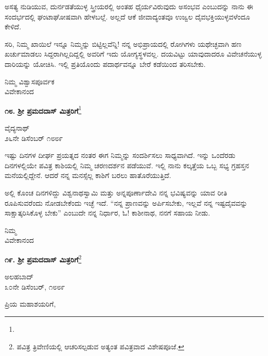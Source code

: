 ಅಸತ್ಯ ನುಡಿಯುವ, ದುರ್ನಡತೆಯುಳ್ಳ ಸ್ತ್ರೀಯರಲ್ಲಿ ಅಂತಹ ಧೈರ್ಯವಿರುವುದು ಅಸಂಭವ ಎಂಬುದನ್ನು ನಾನು ಈ ಸಂದರ್ಭದಲ್ಲಿ ಘಂಟಾಘೋಷವಾಗಿ ಹೇಳಬಲ್ಲೆ. ಅಲ್ಲದೆ ಆಕೆ ಜೀವಾದ್ಯಂತವೂ ಉಜ್ವಲ ದೈವಭಕ್ತಿಯುಳ್ಳವಳೆಂದೂ ಕೇಳಿದೆ.

ಸರಿ, ನಿಮ್ಮ ಖಾಯಿಲೆ ಇನ್ನೂ ನಿಮ್ಮನ್ನು ಬಿಟ್ಟಿಲ್ಲವೆನ್ನಿ! ನನ್ನ ಅಭಿಪ್ರಾಯದಲ್ಲಿ ರೋಗಿಗಳು ಯಥೇಚ್ಛವಾಗಿ ಹಣ ಖರ್ಚುಮಾಡಲು ಸಿದ್ದರಾಗಿಲ್ಲದಿದ್ದಲ್ಲಿ ಅವರಿಗೆ ಇದು ಯೋಗ್ಯಸ್ಥಳವಲ್ಲ. ದಯವಿಟ್ಟು ಯಾವುದಾದರೂ ವಿವೇಚನೆಯುಳ್ಳ ದಾರಿಯನ್ನು ಯೋಚಿಸಿ. ಇಲ್ಲಿ ಪ್ರತಿಯೊಂದು ಪದಾರ್ಥವನ್ನೂ ಬೇರೆ ಕಡೆಯಿಂದ ತರಿಸಬೇಕು.

\vspace{-0.3cm}

{\flushright
ನಿಮ್ಮ ವಿಶ್ವಾಸಪೂರ್ವಕ\\ವಿವೇಕಾನಂದ\par}

\begin{center}
\textbf{೧೮. ಶ‍್ರೀ ಪ್ರಮದದಾಸ್ ಮಿತ್ರರಿಗೆ}\footnote{}
\end{center}

\begin{flushright}
ವೈದ್ಯನಾಥ್\\೨೬ನೇ ಡಿಸೆಂಬರ್ ೧೮೮೯
\end{flushright}

ಇಷ್ಟು ದಿನಗಳ ದೀರ್ಘ ಪ್ರಯತ್ನದ ನಂತರ ಈಗ ನಿಮ್ಮನ್ನು ಸಂದರ್ಶಿಸಲು ಸಾಧ್ಯವಾಗಿದೆ. ಇನ್ನು ಒಂದೆರಡು ದಿನಗಳಲ್ಲಿಯೇ ಪವಿತ್ರ ಕಾಶಿಯಲ್ಲಿ ನಿಮ್ಮ ಚರಣದರ್ಶನ ಪಡೆಯುವೆ. ಇಲ್ಲಿ ನಾನು ಕಲ್ಕತ್ತೆಯ ಒಬ್ಬ ಸಭ್ಯ ಗ್ರಹಸ್ತನ ಮನೆಯಲ್ಲಿದ್ದೇನೆ. ಆದರೆ ನನ್ನ ಮನಸ್ಸೆಲ್ಲ ಕಾಶಿಗೆ ಬರಲು ಹಾತೊರೆಯುತ್ತಿದೆ.

ಅಲ್ಲಿ ಕೊಂಚ ದಿನಗಳಿದ್ದು ವಿಶ್ವನಾಥಸ್ವಾಮಿ ಮತ್ತು ಅನ್ನಪೂರ್ಣಾದೇವಿ ನನ್ನ ಭವಿಷ್ಯವನ್ನು ಯಾವ ರೀತಿ ರೂಪಿಸುವರೆಂದು ನೋಡಬೇಕೆಂದು ಇಚ್ಛೆ ಇದೆ. ``ನನ್ನ ಪ್ರಾಣವನ್ನು ಅರ್ಪಿಸಬೇಕು, ಇಲ್ಲವೆ ನನ್ನ ಇಷ್ಟದೈವವನ್ನು ಸಾಕ್ಷಾತ್ಕರಿಸಿಕೊಳ್ಳ ಬೇಕು” ಎಂಬುದೇ ನನ್ನ ನಿರ್ಧಾರ, ಓ! ಕಾಶೀನಾಥ, ನನಗೆ ಸಹಾಯ ನೀಡು.

{\flushright
ನಿಮ್ಮ\\ವಿವೇಕಾನಂದ\par}

\begin{center}
\textbf{೧೯. ಶ‍್ರೀ ಪ್ರಮದದಾಸ್ ಮಿತ್ರರಿಗೆ}\footnote{ಪವಿತ್ರ ತ್ರಿವೇಣಿಯಲ್ಲಿ ಆಚರಿಸಲ್ಪಡುವ ಅತ್ಯಂತ ಪವಿತ್ರವಾದ ವಿಶೇಷಪೂಜೆ.}
\end{center}

\begin{flushright}
ಅಲಹಬಾದ್\\೩೦ನೇ ಡಿಸೆಂಬರ್, ೧೮೮೯
\end{flushright}

\noindent
ಪ್ರಿಯ ಮಹಾಶಯರಿಗೆ,

